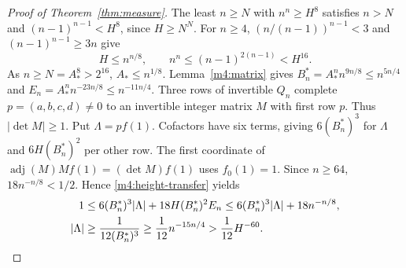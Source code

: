 \begin{proof}[Proof of Theorem~\ref{thm:measure}]
The least $n\ge N$ with $n^n\ge H^8$ satisfies $n>N$ and
$(n-1)^{n-1}<H^8$, since $H\ge N^N$.
For $n\ge4$, $(n/(n-1))^{n-1}<3$ and $(n-1)^{n-1}\ge3n$ give
\begin{equation}\label{m4:height-transfer}
 H\le n^{n/8},\qquad n^n\le(n-1)^{2(n-1)}<H^{16}.
\end{equation}
As $n\ge N=A_*^8>2^{16}$, $A_*\le n^{1/8}$.
Lemma~\ref{m4:matrix} gives $B^*_n=A_*^nn^{9n/8}\le n^{5n/4}$
and $E_n=A_*^nn^{-23n/8}\le n^{-11n/4}$.
Three rows of invertible $Q_n$ complete $p=(a,b,c,d)\ne0$
to an invertible integer matrix $M$ with first row $p$.
Thus $|\det M|\ge1$.
Put $\Lambda=pf(1)$. Cofactors have six terms, giving $6(B^*_n)^3$
for $\Lambda$ and $6H(B^*_n)^2$ per other row.
The first coordinate of $\operatorname{adj}(M)Mf(1)=(\det M)f(1)$ uses $f_0(1)=1$.
Since $n\ge64$, $18n^{-n/8}<1/2$.
Hence \eqref{m4:height-transfer} yields
\begin{align}
 1&\le6(B^*_n)^3|\Lambda|+18H(B^*_n)^2E_n
 \le6(B^*_n)^3|\Lambda|+18n^{-n/8},\label{m4:cofactor}\\
 |\Lambda|&\ge\frac1{12(B^*_n)^3}\ge\frac1{12}n^{-15n/4}
 >\frac1{12}H^{-60}.\notag\qedhere
\end{align}
\end{proof}
